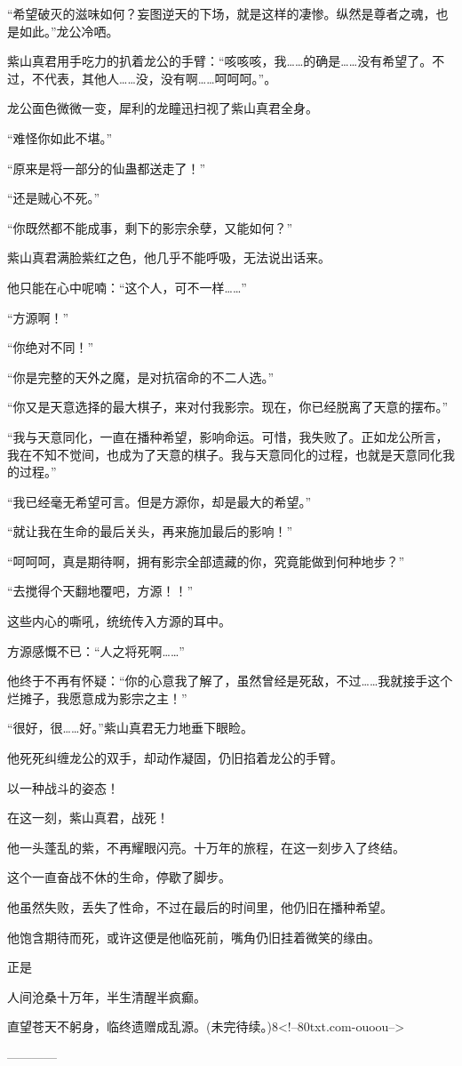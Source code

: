 \begin{this_body}
“希望破灭的滋味如何？妄图逆天的下场，就是这样的凄惨。纵然是尊者之魂，也是如此。”龙公冷哂。

紫山真君用手吃力的扒着龙公的手臂：“咳咳咳，我……的确是……没有希望了。不过，不代表，其他人……没，没有啊……呵呵呵。”。

龙公面色微微一变，犀利的龙瞳迅扫视了紫山真君全身。

“难怪你如此不堪。”

“原来是将一部分的仙蛊都送走了！”

“还是贼心不死。”

“你既然都不能成事，剩下的影宗余孽，又能如何？”

紫山真君满脸紫红之色，他几乎不能呼吸，无法说出话来。

他只能在心中呢喃：“这个人，可不一样……”

“方源啊！”

“你绝对不同！”

“你是完整的天外之魔，是对抗宿命的不二人选。”

“你又是天意选择的最大棋子，来对付我影宗。现在，你已经脱离了天意的摆布。”

“我与天意同化，一直在播种希望，影响命运。可惜，我失败了。正如龙公所言，我在不知不觉间，也成为了天意的棋子。我与天意同化的过程，也就是天意同化我的过程。”

“我已经毫无希望可言。但是方源你，却是最大的希望。”

“就让我在生命的最后关头，再来施加最后的影响！”

“呵呵呵，真是期待啊，拥有影宗全部遗藏的你，究竟能做到何种地步？”

“去搅得个天翻地覆吧，方源！！”

这些内心的嘶吼，统统传入方源的耳中。

方源感慨不已：“人之将死啊……”

他终于不再有怀疑：“你的心意我了解了，虽然曾经是死敌，不过……我就接手这个烂摊子，我愿意成为影宗之主！”

“很好，很……好。”紫山真君无力地垂下眼睑。

他死死纠缠龙公的双手，却动作凝固，仍旧掐着龙公的手臂。

以一种战斗的姿态！

在这一刻，紫山真君，战死！

他一头蓬乱的紫，不再耀眼闪亮。十万年的旅程，在这一刻步入了终结。

这个一直奋战不休的生命，停歇了脚步。

他虽然失败，丢失了性命，不过在最后的时间里，他仍旧在播种希望。

他饱含期待而死，或许这便是他临死前，嘴角仍旧挂着微笑的缘由。

正是

人间沧桑十万年，半生清醒半疯癫。

直望苍天不躬身，临终遗赠成乱源。(未完待续。)8<!--80txt.com-ouoou-->

------------

\end{this_body}

